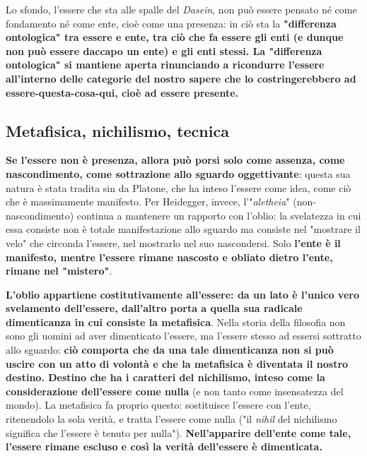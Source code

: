 Lo sfondo, l'essere che sta alle spalle del \textit{Dasein},
non può essere pensato né come fondamento né
come ente, cioè come una presenza: in ciò sta
la \textbf{"differenza ontologica" tra essere e ente, tra
ciò che fa essere gli enti (e dunque non può essere
daccapo un ente) e gli enti stessi.
La "differenza ontologica" si mantiene aperta rinunciando
a ricondurre l'essere all'interno delle categorie del
nostro sapere che lo costringerebbero ad
essere-questa-cosa-qui, cioè ad essere presente.}

\subsection{Metafisica, nichilismo, tecnica}

\textbf{Se l'essere non è presenza, allora può porsi solo
come assenza, come nascondimento, come sottrazione
allo sguardo oggettivante}: questa sua natura è stata
tradita sin da Platone, che ha inteso l'essere
come idea, come ciò che è massimamente manifesto.
Per Heidegger, invece, l'"\textit{aletheia}" (non-nascondimento)
continua a mantenere un rapporto con l'oblio: la
svelatezza in cui essa consiste non è totale
manifestazione allo sguardo ma consiste nel
"mostrare il velo" che circonda l'essere, nel
mostrarlo nel suo nascondersi. Solo \textbf{l'ente è il
manifesto, mentre l'essere rimane nascosto e
obliato dietro l'ente, rimane nel "mistero"}.

\textbf{L'oblio appartiene costitutivamente all'essere:
da un lato è l'unico vero svelamento dell'essere,
dall'altro porta a quella sua radicale dimenticanza
in cui consiste la metafisica}. Nella storia della
filosofia non sono gli uomini ad aver
dimenticato l'essere, ma l'essere stesso ad
essersi sottratto allo sguardo: \textbf{ciò comporta che da una tale dimenticanza non si può uscire
con un atto di volontà e che la metafisica
è diventata il nostro destino.
Destino che ha i caratteri del nichilismo, inteso
come la considerazione dell'essere come nulla}
(e non tanto come insensatezza del mondo). La metafisica fa proprio questo: sostituisce l'essere
con l'ente, ritenendolo la sola verità, e tratta
l'essere come nulla ("il \textit{nihil} del nichilismo
significa che l'essere è tenuto per nulla").
\textbf{Nell'apparire dell'ente come tale, l'essere rimane
escluso e così la verità dell'essere è dimenticata.}

